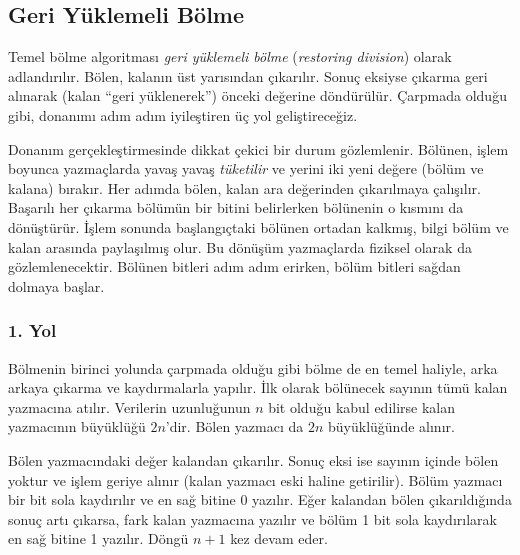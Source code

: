 \subsection{Geri Yüklemeli Bölme}
\label{sec:geri-yuklemeli-bolme}

Temel bölme algoritması \emph{geri yüklemeli bölme} (\emph{restoring division}) olarak adlandırılır. Bölen, kalanın üst yarısından çıkarılır. Sonuç eksiyse çıkarma geri alınarak (kalan ``geri yüklenerek'') önceki değerine döndürülür. Çarpmada olduğu gibi, donanımı adım adım iyileştiren üç yol geliştireceğiz.

Donanım gerçekleştirmesinde dikkat çekici bir durum gözlemlenir. Bölünen, işlem boyunca yazmaçlarda yavaş yavaş \emph{tüketilir} ve yerini iki yeni değere (bölüm ve kalana) bırakır. Her adımda bölen, kalan ara değerinden çıkarılmaya çalışılır. Başarılı her çıkarma bölümün bir bitini belirlerken bölünenin o kısmını da dönüştürür. İşlem sonunda başlangıçtaki bölünen ortadan kalkmış, bilgi bölüm ve kalan arasında paylaşılmış olur. Bu dönüşüm yazmaçlarda fiziksel olarak da gözlemlenecektir. Bölünen bitleri adım adım erirken, bölüm bitleri sağdan dolmaya başlar.

\subsubsection{1. Yol}

Bölmenin birinci yolunda çarpmada olduğu gibi bölme de en temel haliyle, arka arkaya çıkarma ve kaydırmalarla yapılır. İlk olarak bölünecek sayının tümü kalan yazmacına atılır. Verilerin uzunluğunun $n$ bit olduğu kabul edilirse kalan yazmacının büyüklüğü $2n$'dir. Bölen yazmacı da $2n$ büyüklüğünde alınır.

Bölen yazmacındaki değer kalandan çıkarılır. Sonuç eksi ise sayının içinde bölen yoktur ve işlem geriye alınır (kalan yazmacı eski haline getirilir). Bölüm yazmacı bir bit sola kaydırılır ve en sağ bitine 0 yazılır. Eğer kalandan bölen çıkarıldığında sonuç artı çıkarsa, fark kalan yazmacına yazılır ve bölüm 1 bit sola kaydırılarak en sağ bitine 1 yazılır. Döngü $n+1$ kez devam eder.

